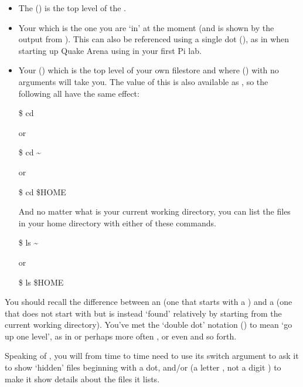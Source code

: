 \begin{itemize}
\item The  (\ttout{/}) is the top level of the
.

\item Your  which is the one you are `in'
at the moment (and is shown by the output from ). This can also
be referenced using a single dot (), as in when starting up Quake Arena using
 in your first Pi lab.

\item Your  (\ttout{\tilde}) which is the top level of
your own filestore and where  () with no
arguments will take you.  The value of this is also available as
, so the following all have the same effect:

\begin{ttoutenv}
\$  cd
\end{ttoutenv}
or
\begin{ttoutenv}
\$  cd \textasciitilde
\end{ttoutenv}
or
\begin{ttoutenv}
\$  cd \$HOME
\end{ttoutenv}

And no matter what is your current working directory, you can list the files
in your home directory with either of these commands.

\begin{ttoutenv}
\$  ls \textasciitilde
\end{ttoutenv}
or
\begin{ttoutenv}
\$  ls \$HOME
\end{ttoutenv}

\end{itemize}

You should recall the difference between an  (one
that starts with a \ttout{/}) and a  (one that does not
start with \ttout{/} but is instead `found' relatively by starting from the
current working directory). You've met the `double dot' notation
() to mean `go up one level', as in  or perhaps more
often , or even  and so forth.

Speaking of , you will from time to time need to use its
 switch argument to ask it to show `hidden' files beginning with a dot,
and/or  (a letter , not a digit ) to make it show details about the files it lists.

